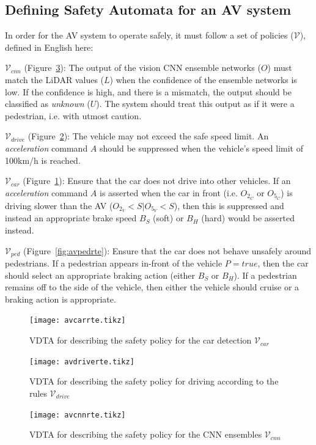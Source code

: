 \subsection{Defining Safety Automata for an \ac{AV} system}
In order for the \ac{AV} system to operate safely, it must follow a set of policies ($\mathcal{V}$), defined in English here:

$\mathcal{V}_{cnn}$ (Figure~\ref{fig:avcnnrte}): The output of the vision \ac{CNN} ensemble networks ($O$) must match the \ac{LiDAR} values ($L$) when the confidence of the ensemble networks is low. 
If the confidence is high, and there is a mismatch, the output should be classified as \textit{unknown} ($U$).
The system should treat this output as if it were a pedestrian, i.e. with utmost caution.

$\mathcal{V}_{drive}$ (Figure~\ref{fig:avdriverte}): The vehicle may not exceed the safe speed limit. 
An \textit{acceleration} command $A$ should be suppressed when the vehicle's speed limit of 100km/h is reached.

$\mathcal{V}_{car}$ (Figure~\ref{fig:avcarrte}): Ensure that the car does not drive into other vehicles. If an \textit{acceleration} command $A$ is asserted when the car in front (i.e. $O_{2_C}$ or $O_{5_C}$) is driving slower than the \ac{AV} ($O_{2_V}<S|O_{5_V}<S$), then this is suppressed and instead an appropriate brake speed $B_S$ (soft) or $B_H$ (hard) would be asserted instead.

$\mathcal{V}_{ped}$ (Figure~\ref{fig:avpedrte}): Ensure that the car does not behave unsafely around pedestrians. If a pedestrian appears in-front of the vehicle $P=true$, then the car should select an appropriate braking action (either $B_S$ or $B_H$). If a pedestrian remains off to the side of the vehicle, then either the vehicle should cruise or a braking action is appropriate.

\begin{figure}[H]
	\centering
	\texttt{[image: avcarrte.tikz]}
	\caption{\ac{VDTA} for describing the safety policy for the car detection $\mathcal{V}_{car}$\label{fig:avcarrte}}
\end{figure}
\begin{figure}[H]
	\centering
	\texttt{[image: avdriverte.tikz]}
	\caption{\ac{VDTA} for describing the safety policy for driving according to the rules $\mathcal{V}_{drive}$\label{fig:avdriverte}}
\end{figure}
\begin{figure}[H]
	\centering
	\texttt{[image: avcnnrte.tikz]}
	\caption{\ac{VDTA} for describing the safety policy for the \ac{CNN} ensembles $\mathcal{V}_{cnn}$\label{fig:avcnnrte}}
\end{figure}

